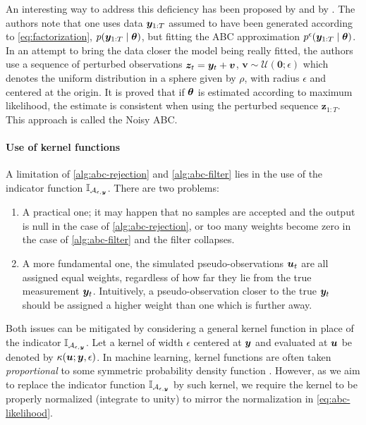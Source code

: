 An interesting way to address this deficiency has been proposed by \cite{noisy-abc1} and by \cite{noisy-abc2}. The authors note that one uses data $\bm{y}_{1:T}$ assumed to have been generated according to \eqref{eq:factorization}, $p(\bm{y}_{1:T} \mid \bm{\theta})$, but fitting the ABC approximation $p^\epsilon(\bm{y}_{1:T} \mid \bm{\theta})$. In an attempt to bring the data closer the model being really fitted, the authors use a sequence of perturbed observations $\bm{z}_t = \bm{y}_t + \bm{v}$, $\bm{v} \sim \mathcal{U}(\bm{0}; \epsilon)$ which denotes the uniform distribution in a sphere given by $\rho$, with radius $\epsilon$ and centered at the origin. It is proved that if $\bm{\theta}$ is estimated according to maximum likelihood, the estimate is consistent when using the perturbed sequence $\bm{z}_{1:T}$. This approach is called the Noisy ABC.


\paragraph{Use of kernel functions}
A limitation of \autoref{alg:abc-rejection} and \autoref{alg:abc-filter} lies in the use of the indicator function $\mathbb{I}_{\mathcal{A}_{\epsilon, \bm{y}}}$. There are two problems:
\begin{enumerate}
    \item A practical one; it may happen that no samples are accepted and the output is null in the case of \autoref{alg:abc-rejection}, or too many weights become zero in the case of \autoref{alg:abc-filter} and the filter collapses.
    \item A more fundamental one, the simulated pseudo-observations $\bm{u}_t$ are all assigned equal weights, regardless of how far they lie from the true measurement $\bm{y}_t$. Intuitively, a pseudo-observation closer to the true $\bm{y}_t$ should be assigned a higher weight than one which is further away.
\end{enumerate}
Both issues can be mitigated by considering a general kernel function in place of the indicator $\mathbb{I}_{\mathcal{A}_{\epsilon, \bm{y}}}$. Let a kernel of width $\epsilon$ centered at $\bm{y}$ and evaluated at $\bm{u}$ be denoted by $\kappa(\bm{u}; \bm{y}, \epsilon)$. In machine learning, kernel functions are often taken \emph{proportional} to some symmetric probability density function \citep{elements}. However, as we aim to replace the indicator function $\mathbb{I}_{\mathcal{A}_{\epsilon, \bm{y}}}$ by such kernel, we require the kernel to be properly normalized (integrate to unity) to mirror the normalization in \eqref{eq:abc-likelihood}.

